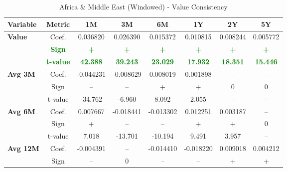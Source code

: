 \documentclass[11pt,english,a4paper,hidelinks]{book}
\begin{document}
\begin{table}[H]
    \centering
    \caption{Africa \& Middle East (Windowed) - Value Consistency}
    \begin{tabular}{lccccccc}
        \toprule
        \textbf{Variable} & \textbf{Metric} & \textbf{1M} & \textbf{3M} & \textbf{6M} & \textbf{1Y} & \textbf{2Y} & \textbf{5Y} \\
        \midrule
        \multirow{3}{*}{\textbf{Value}}
            & Coef.   & 0.036820  & 0.026390  & 0.015372  & 0.010815  & 0.008244  & 0.005772  \\
            & \textbf{\textcolor{green}{Sign}}
                     & \textbf{\textcolor{green}{+}}
                     & \textbf{\textcolor{green}{+}}
                     & \textbf{\textcolor{green}{+}}
                     & \textbf{\textcolor{green}{+}}
                     & \textbf{\textcolor{green}{+}}
                     & \textbf{\textcolor{green}{+}} \\
            & \textbf{\textcolor{green}{t-value}}
                     & \textbf{\textcolor{green}{42.388}}
                     & \textbf{\textcolor{green}{39.243}}
                     & \textbf{\textcolor{green}{23.029}}
                     & \textbf{\textcolor{green}{17.932}}
                     & \textbf{\textcolor{green}{18.351}}
                     & \textbf{\textcolor{green}{15.446}} \\
        \cmidrule{1-8}
        \multirow{3}{*}{\textbf{Avg 3M}}
            & Coef.   & -0.044231 & -0.008629 & 0.008019  & 0.001898  & --        & --        \\
            & Sign    & –         & –         & +         & +         & 0         & 0         \\
            & t-value & -34.762   & -6.960    & 8.092     & 2.055     & --        & --        \\
        \cmidrule{1-8}
        \multirow{3}{*}{\textbf{Avg 6M}}
            & Coef.   & 0.007667  & -0.018441 & -0.013302 & 0.012251  & 0.003187  & --        \\
            & Sign    & +         & –         & –         & +         & +         & 0         \\
            & t-value & 7.018     & -13.701   & -10.194   & 9.491     & 3.957     & --        \\
        \cmidrule{1-8}
        \multirow{3}{*}{\textbf{Avg 12M}}
            & Coef.   & -0.004391 & --        & -0.014410 & -0.018220 & 0.009018  & 0.004212  \\
            & Sign    & –         & 0         & –         & –         & +         & +         \\

\end{tabular}
\end{table}
\end{document}
